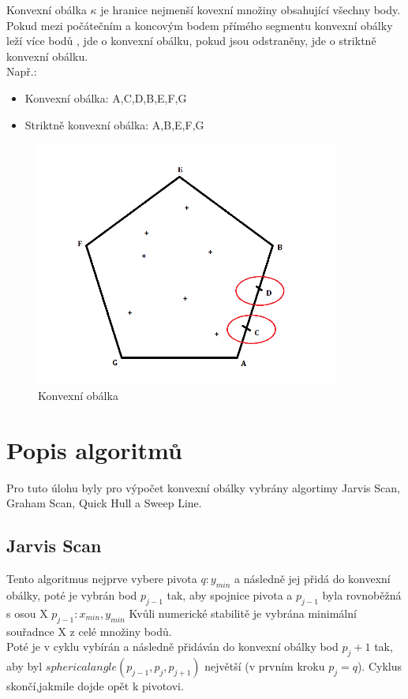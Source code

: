 \documentclass[a4paper, 12pt]{article}
\begin{document}
Konvexní obálka $\kappa$ je hranice nejmenší kovexní množiny obsahující všechny body. \\
Pokud mezi počátečním a koncovým bodem přímého segmentu konvexní obálky leží více bodů , jde o konvexní obálku, pokud jsou odstraněny, jde o striktně konvexní obálku. \\
Např.:
\begin{itemize}
\item Konvexní obálka: A,C,D,B,E,F,G
\item Striktně konvexní obálka: A,B,E,F,G
\end{itemize}
\begin{figure}[h]
	\centering
	\includegraphics[width=10cm]{KO.png}
	\caption{Konvexní obálka}
\end{figure}


\clearpage
\section{Popis algoritmů}

Pro tuto úlohu byly pro výpočet konvexní obálky vybrány algortimy Jarvis Scan, Graham Scan, Quick Hull a Sweep Line.\\

\subsection{Jarvis Scan}
Tento algoritmus nejprve vybere pivota $q: y_{min}$ a následně jej přidá do konvexní obálky, poté je vybrán bod $p_{j-1}$ tak, aby spojnice pivota a $p_{j-1}$ byla rovnoběžná s osou X $p_{j-1}: x_{min}, y_{min}$ Kvůli numerické stabilitě je vybrána minimální souřadnce X z celé množiny bodů. \\
Poté je v cyklu vybírán a následně přidáván do konvexní obálky bod $p_j+1$ tak, aby byl $sphericalangle (p_{j-1}, p_j, p_{j+1})$ největší (v prvním kroku $p_j = q$). Cyklus skončí,jakmile dojde opět k pivotovi.
\vspace{1.5cm}
\end{document}
